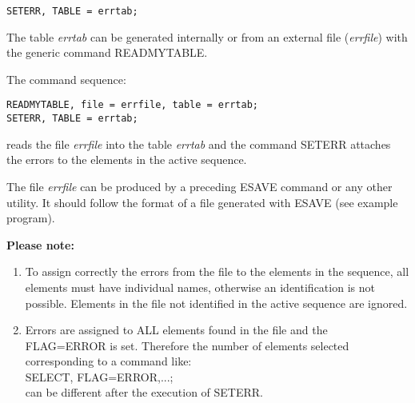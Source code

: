 \begin{verbatim}
SETERR, TABLE = errtab;
\end{verbatim}
The table \textit{errtab} can be generated internally or from an
external file (\textit{errfile}) with the generic command READMYTABLE.  
 

The command sequence: 
\begin{verbatim}
READMYTABLE, file = errfile, table = errtab;
SETERR, TABLE = errtab;
\end{verbatim}
reads the file \textit{errfile} into the table \textit{errtab} and the
command SETERR attaches the errors to the elements in the active
sequence.  

The file \textit{errfile} can be produced by a preceding ESAVE command
or any other utility. It should follow the format of a file generated
with ESAVE (see example program). 

{\bf Please note:}
\begin{enumerate}
   \item To assign correctly the errors from the file to the elements in
     the sequence, all elements must have individual names, otherwise an
     identification is not possible. Elements in the file not identified
     in the active sequence are ignored.  
   \item Errors are assigned to ALL elements found in the file and the
     FLAG=ERROR is set. Therefore the number of elements selected
     corresponding to a command like:  
     \\ SELECT, FLAG=ERROR,...;
     \\ can be different after the execution of SETERR. 
\end{enumerate}


